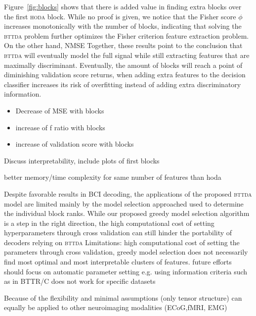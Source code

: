 \documentclass[twocolumn]{article}
\begin{document}
Figure~\ref{fig:blocks} shows that there is added value in finding extra blocks
over the first \textsc{hoda} block.
While no proof is given, we notice that the Fisher score $\phi$ increases
monotonically with the number of blocks, indicating that solving the
\textsc{bttda} problem further optimizes the Fisher criterion feature
extraction problem.
On the other hand, NMSE 
Together, these results point to the conclusion that \textsc{bttda} will
eventually model the full signal while still extracting features that are
maximally discriminant.
Eventually, the amount of blocks will reach a point of diminishing validation
score returns, when adding extra features to the decision classifier increases
its risk of overfitting instead of adding extra discriminatory information.
\begin{itemize}
  \item Decrease of MSE with blocks
  \item increase of f ratio with blocks
  \item increase of validation score with blocks
\end{itemize}

Discuss interpretability, include plots of first blocks

better memory/time complexity for same number of features than hoda

Despite favorable results in BCI decoding, the applications of the proposed
\textsc{bttda} model are limited mainly by the model selection approached used
to determine the individual block ranks.
While our proposed greedy model selection algorithm is a step in the right
direction, the high computational cost of setting hyperparameters through cross
validation can still hinder the portability of decoders relying on
\textsc{bttda}
Limitations: high computational cost of setting the parameters through cross
validation, greedy model
selection does not necessarily find most optimal and most interpretable
clusters of features. future efforts
should focus on automatic parameter setting e.g. using information criteria
such as in BTTR/C
does not work for specific datasets


Because of the flexibility and minimal assumptions (only tensor structure)
can equally be applied to other neuroimaging modalities (ECoG,fMRI, EMG)

\printbibliography
\end{document}
